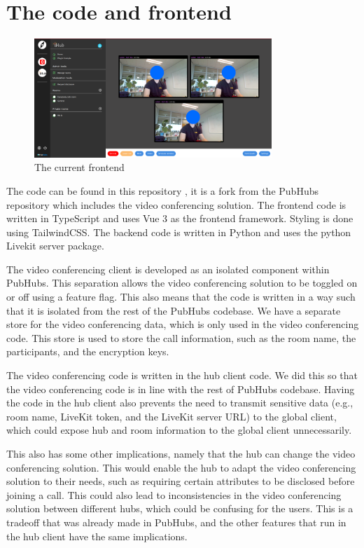 \documentclass{report}
\begin{document}
\section{The code and frontend}
\begin{figure}[!hbt]
\centering
\includegraphics[width=0.8\textwidth]{img/frontend.png}
\caption{The current frontend}
\label{fig:front-end-setup}
\end{figure}
The code can be found in this repository \cite{horst_gulianrdgdmaster-scriptie-pubhubs_2024}, it is a fork from the PubHubs
repository which includes the video conferencing solution. The frontend code is written in TypeScript and uses Vue 3
as the frontend framework. Styling is done using TailwindCSS. The backend code is written in Python and uses the
python Livekit server package.

The video conferencing client is developed as an isolated component within PubHubs. This separation allows the
video conferencing solution to be toggled on or off using a feature flag.
This also means that the code is written in a way such that it is isolated from the rest of the PubHubs codebase.
We have a separate store for the video conferencing data, which is only used in the video conferencing code.
This store is used to store the call information, such as the room name, the participants, and the encryption keys.

The video conferencing code is written in the hub client code. We did this so that the video conferencing code is in
line with the rest of PubHubs codebase.
Having the code in the hub client also prevents the need to transmit sensitive data (e.g., room name, LiveKit token,
and the LiveKit server URL) to the global client, which could expose hub and room information to the global client
unnecessarily.

This also has some other implications, namely that the hub can change the video conferencing solution.
This would enable the hub to adapt the video conferencing solution to their needs, such as requiring certain
attributes to be disclosed before joining a call.
This could also lead to inconsistencies in the video conferencing solution between different hubs, which could be
confusing for the users. This is a tradeoff that was already made in PubHubs, and the other features that run in the
hub client have the same implications.
\end{document}
